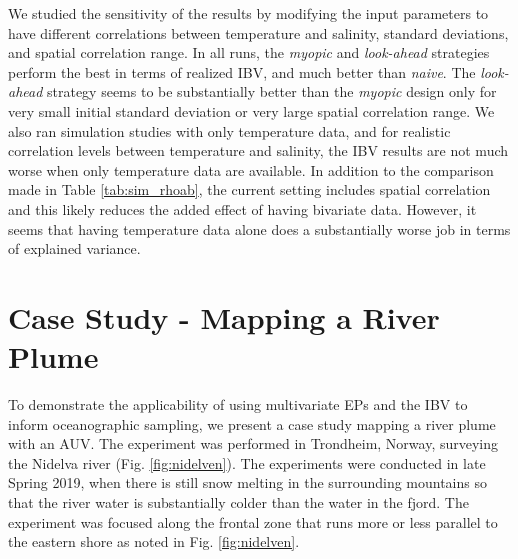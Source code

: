 \documentclass[aoas]{imsart}
\begin{document}

We studied the sensitivity of the results by modifying the input
parameters to have different correlations between temperature and
salinity, standard deviations, and spatial correlation range.  In all
runs, the \textit{myopic} and \textit{look-ahead} strategies perform
the best in terms of realized IBV, and much better than
\textit{naive}. The \textit{look-ahead} strategy seems to be
substantially better than the \textit{myopic} design only for very
small initial standard deviation or very large spatial correlation
range. 
We also ran simulation studies with only
temperature data, and for realistic correlation levels between
temperature and salinity, the IBV results are not much worse when only
temperature data are available. In addition to the comparison made in
Table \ref{tab:sim_rhoab}, the current setting includes spatial
correlation and this likely reduces the added effect of having
bivariate data. However, it seems that having temperature data alone
does a substantially worse job in terms of explained variance.

\section{Case Study - Mapping a River Plume}
\label{sec:case_study}

To demonstrate the applicability of using multivariate EPs and the IBV
to inform oceanographic sampling, we present a case study mapping a
river plume with an AUV. The experiment was performed in Trondheim,
Norway, surveying the Nidelva river (Fig. \ref{fig:nidelven}). The
experiments were conducted in late Spring 2019, when there is still
snow melting in the surrounding mountains so that the river water is
substantially colder than the water in the fjord. The experiment was
focused along the frontal zone that runs more or less parallel to the
eastern shore as noted in Fig. \ref{fig:nidelven}.
\end{document}
